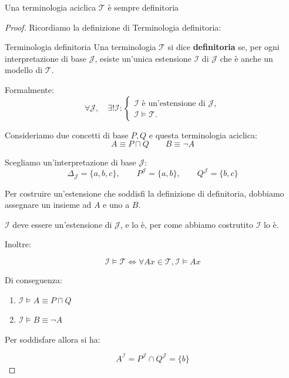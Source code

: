 \begin{theorem}{}
    Una terminologia aciclica $\mathcal{T}$ è sempre definitoria
\end{theorem}
\begin{proof}
    Ricordiamo la definizione di Terminologia definitoria:
    \begin{definition}{Terminologia definitoria}
    Una terminologia $\mathcal{T}$ si dice \textbf{definitoria}
    se, per ogni interpretazione di base $\mathcal{J}$,
    esiste un'unica estensione $\mathcal{I}$ di $\mathcal{J}$
    che è anche un modello di $\mathcal{T}$.

    Formalmente:
    \[
        \forall \mathcal{J}, \quad
        \exists! \mathcal{I} :
        \begin{cases}
            \mathcal{I} \text{ è un'estensione di } \mathcal{J},\\
            \mathcal{I} \models \mathcal{T}.
        \end{cases}
    \]
\end{definition}
Consideriamo due concetti di base $P,Q$ e questa
    terminologia aciclica:
    \[
        A \equiv P \sqcap Q
        \qquad
        B \equiv \neg A
    \]

    Scegliamo un'interpretazione di base $\mathcal{J}$:
    \[
        \Delta_{\mathcal{J}} = \{a,b,c\},
        \qquad P^{\mathcal{J}} = \{a,b\},
        \qquad Q^{\mathcal{J}} = \{b,c\}
    \]

    Per costruire un'estensione che soddisfi la definizione di definitoria,
    dobbiamo assegnare un insieme ad $A$ e uno a $B$.

    $\mathcal{I}$ deve essere un'estensione di $\mathcal{J}$, e lo è, per come abbiamo costrutito $\mathcal{I}$ lo è.

    Inoltre:


    \[
    \mathcal{I} \models \mathcal{T} \iff \forall Ax \in \mathcal{T} , \mathcal{I} \models Ax
    \]

    Di conseguenza:

    \begin{enumerate}
        \item $\mathcal{I} \models A \equiv P \sqcap Q$
        \item $\mathcal{I} \models B \equiv \neg A$
    \end{enumerate}

    Per soddisfare allora si ha:


    \[
        A^{\mathcal{I}} =
        P^{\mathcal{J}} \cap Q^{\mathcal{J}} = \{b\}
    \]


\end{proof}
